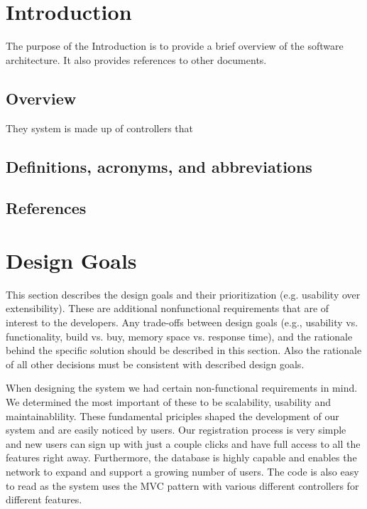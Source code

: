 \documentclass[a4paper,12pt]{scrartcl}
\newenvironment{subs}
{\adjustwidth{3em}{0pt}}
{\endadjustwidth}
\begin{document}
    \section{Introduction}
    The purpose of the Introduction is to provide a brief overview of the software architecture. It also provides references to other documents.
    \begin{subs}
        \subsection{Overview}
        They system is made up of controllers that 

        \subsection{Definitions, acronyms, and abbreviations}

        \subsection{References}
    \end{subs}


    \section{Design Goals}
    This section describes the design goals and their prioritization (e.g. usability over extensibility). These are additional nonfunctional requirements that are of interest to the developers. Any trade-offs between design goals (e.g., usability vs. functionality, build vs. buy, memory space vs. response time), and the rationale behind the specific solution should be described in this section. Also the rationale of all other decisions must be consistent with described design goals.
    
    When designing the system we had certain non-functional requirements in mind. We determined the most important of these to be scalability, usability and maintainablility. These fundamental priciples shaped the development of our system and are easily noticed by users. Our registration process is very simple and new users can sign up with just a couple clicks and have full access to all the features right away. Furthermore, the database is highly capable and enables the network to expand and support a growing number of users. The code is also easy to read as the system uses the MVC pattern with various different controllers for different features.
\end{document}
